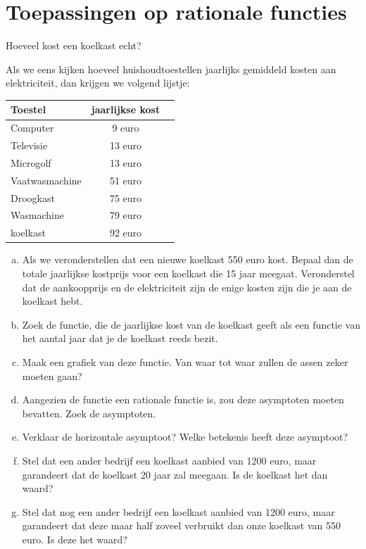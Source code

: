 \documentclass[12pt]{article}
\begin{document}
\pagebreak
\section{Toepassingen op rationale functies}


\begin{oefening}
Hoeveel kost een koelkast echt?

Als we eens kijken hoeveel huishoudtoestellen jaarlijks gemiddeld kosten aan elektriciteit, dan krijgen we volgend lijstje:
\begin{center}
  \begin{tabular}{l|cl}
  Toestel & jaarlijkse kost\\
  \hline
  Computer & 9 euro\\ 
  Televisie & 13 euro\\
  Microgolf & 13 euro\\
  Vaatwasmachine & 51 euro\\
  Droogkast & 75 euro\\
  Wasmachine & 79 euro\\
  koelkast & 92 euro\\ 
  \end{tabular}
\end{center}

\begin{enumerate}[(a)]
  \item Als we veronderstellen dat een nieuwe koelkast 550 euro kost. Bepaal dan de totale jaarlijkse kostprijs voor een koelkast die 15 jaar meegaat. Veronderstel dat de aankoopprijs en de elektriciteit zijn de enige kosten zijn die je aan de koelkast hebt.
  \item Zoek de functie, die de jaarlijkse kost van de koelkast geeft als een functie van het aantal jaar dat je de koelkast reeds bezit.
  \item Maak een grafiek van deze functie. Van waar tot waar zullen de assen zeker moeten gaan?
  \item Aangezien de functie een rationale functie is, zou deze asymptoten moeten bevatten. Zoek de asymptoten.
  \item Verklaar de horizontale asymptoot? Welke betekenis heeft deze asymptoot?
  \item Stel dat een ander bedrijf een koelkast aanbied van 1200 euro, maar garandeert dat de koelkast 20 jaar zal meegaan. Is de koelkast het dan waard?
  \item Stel dat nog een ander bedrijf een koelkast aanbied van 1200 euro, maar garandeert dat deze maar half zoveel verbruikt dan onze koelkast van 550 euro. Is deze het waard?
\end{enumerate}
\end{oefening}
\end{document}
